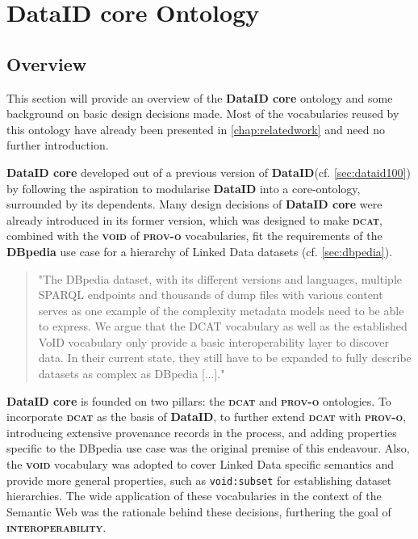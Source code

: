 \documentclass[a4paper,english,twoside,BCOR1.5cm,headsepline,DIV12,appendixprefix,final,12pt]{scrbook}
\newcommand{\interoperability}{{\ttfamily\scshape\bfseries interoperability}\xspace}
\newcommand{\dataid}{{\ttfamily\bfseries DataID}\xspace}
\newcommand{\core}{{\ttfamily\bfseries DataID core}\xspace}
\newcommand{\prov}{{\scshape\bfseries prov-o}\xspace}
\newcommand{\void}{{\scshape\bfseries void}\xspace}
\newcommand{\dcat}{{\scshape\bfseries dcat}\xspace}
\newcommand{\dbpedia}{{\ttfamily\bfseries DBpedia}\xspace}
\newcommand{\prop}[1]{{{\texttt{#1}}}}
\begin{document}
\chapter{DataID core Ontology}
\label{cahp:core}

\section{Overview} 
\label{sec:coreintro}

This section will provide an overview of the \core ontology and some background on basic design decisions made. Most of the vocabularies reused by this ontology have already been presented in \cref{chap:relatedwork} and need no further introduction.

\core developed out of a previous version of \dataid (cf. \cref{sec:dataid100}) by following the aspiration to modularise \dataid into a core-ontology, surrounded by its dependents. Many design decisions of \core were already introduced in its former version, which was designed to make \dcat, combined with the \void of \prov vocabularies, fit the requirements of the \dbpedia use case for a hierarchy of Linked Data datasets (cf. \cref{sec:dbpedia}).

\begin{quote}
"The DBpedia dataset, with
its different versions and languages, multiple SPARQL endpoints
and thousands of dump files with various content
serves as one example of the complexity metadata models
need to be able to express. We argue that the DCAT vocabulary
as well as the established VoID vocabulary only
provide a basic interoperability layer to discover data. In
their current state, they still have to be expanded to fully
describe datasets as complex as DBpedia [...]." \cite{dataID2014} 
\end{quote}

\core is founded on two pillars: the \dcat and \prov ontologies. To incorporate \dcat as the basis of \dataid, to further extend \dcat with \prov, introducing extensive provenance records in the process, and adding properties specific to the DBpedia use case was the original premise of this endeavour. Also, the \void vocabulary was adopted to cover Linked Data specific semantics and provide more general properties, such as  \prop{void:subset} for establishing dataset hierarchies. The wide application of these vocabularies in the context of the Semantic Web was the rationale behind these decisions, furthering the goal of \interoperability. 
\end{document}
